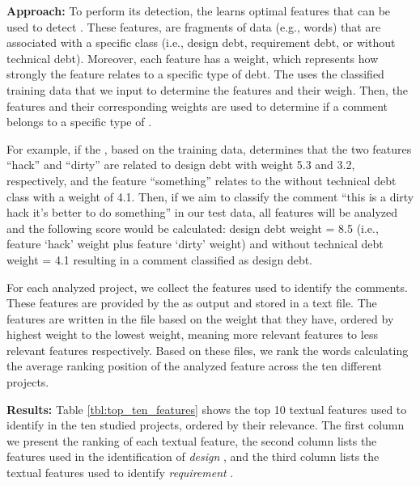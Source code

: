 \vspace{1mm}
\noindent \textbf{Approach:} To perform its detection, the  learns optimal features that can be used to detect \SATD. These features, are fragments of data (e.g., words) that are associated with a specific class (i.e., design debt, requirement debt, or without technical debt). Moreover, each feature has a weight, which represents how strongly the feature relates to a specific type of debt. The  uses the classified training data that we input to determine the features and their weigh. Then, the features and their corresponding weights are used to determine if a comment belongs to a specific type of \SATD.

For example, if the , based on the training data, determines that the two features ``hack'' and ``dirty'' are related to design debt with weight 5.3 and 3.2, respectively, and the feature ``something'' relates to the without technical debt class with a weight of 4.1. Then, if we aim to classify the comment ``this is a dirty hack it's better to do something'' in our test data, all features will be analyzed and the following score would be calculated: design debt weight = 8.5 (i.e., feature `hack' weight plus feature `dirty' weight) and without technical debt weight = 4.1 resulting in a comment classified as design debt.

For each analyzed project, we collect the features used to identify the \SATD comments. These features are provided by the  as output and stored in a text file. The features are written in the file based on the weight that they have, ordered by highest weight to the lowest weight, meaning more relevant features to less relevant features respectively. Based on these files, we rank the words calculating the average ranking position of the analyzed feature across the ten different projects. 

\noindent \textbf{Results:} Table \ref{tbl:top_ten_features} shows the top 10 textual features used to identify  \SATD in the ten studied projects, ordered by their relevance. The first column we present the ranking of each textual feature, the second column lists the features used in the identification of \emph{design} \SATD, and the third column lists the textual features used to identify \emph{requirement} \SATD.

